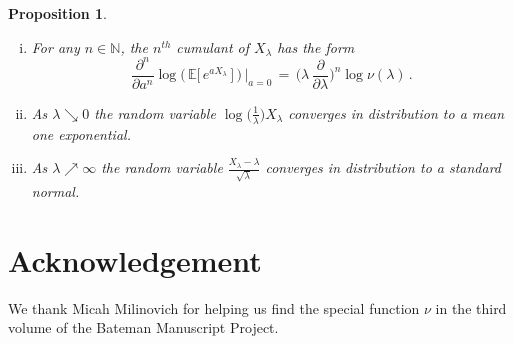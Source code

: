 \documentclass[10pt]{article}
\numberwithin{equation}{section}
\newtheorem{proposition}[theorem]{Proposition}
\theoremstyle{definition}
\begin{document}
\begin{appendix}
\begin{proposition}
\begin{enumerate}[(i)]
    \item For any $n\in \mathbb{N}$, the $n^{th}$ cumulant of $X_{\lambda}$  has the form 
    $$\frac{\partial^n}{\partial a^n} \log\Big(\,\mathbb{E}\big[ \, e^{a X_{\lambda} } \,\big] \,\Big)\,\Big|_{a=0}\,=\,\bigg(\lambda\,\frac{\partial}{\partial \lambda  }\bigg)^{n}\log \nu(\lambda ) \,. $$

    \item As $\lambda \searrow 0$ the random variable $\log\big(\frac{1}{\lambda} \big) X_{\lambda} $ converges  in distribution  to a mean one exponential. 

    \item As $\lambda \nearrow \infty $ the random variable $\frac{ X_{\lambda}-\lambda  }{\sqrt{\lambda}  } $ converges  in distribution  to a standard normal. 
    
\end{enumerate}

    
\end{proposition}






\end{appendix}

\section*{Acknowledgement} We thank Micah Milinovich for helping us find the special function $\nu$ in the third volume of the Bateman Manuscript Project.
\end{document}

